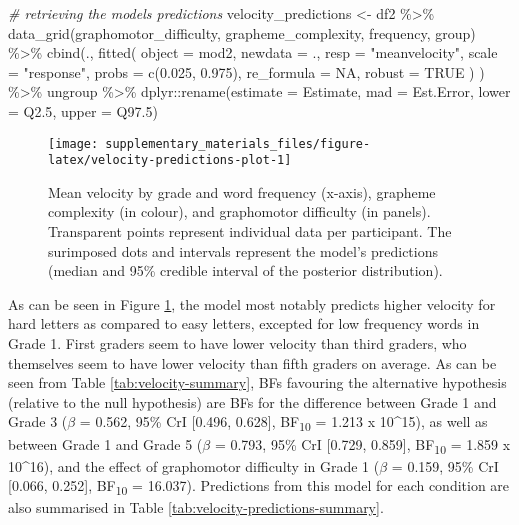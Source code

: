 \documentclass[
  11pt,
  english,
  ,doc,floatsintext]{apa6}
\newenvironment{Shaded}{}{}
\newcommand{\AttributeTok}[1]{\textcolor[rgb]{0.49,0.56,0.16}{#1}}
\newcommand{\CommentTok}[1]{\textcolor[rgb]{0.38,0.63,0.69}{\textit{#1}}}
\newcommand{\ConstantTok}[1]{\textcolor[rgb]{0.53,0.00,0.00}{#1}}
\newcommand{\FloatTok}[1]{\textcolor[rgb]{0.25,0.63,0.44}{#1}}
\newcommand{\FunctionTok}[1]{\textcolor[rgb]{0.02,0.16,0.49}{#1}}
\newcommand{\NormalTok}[1]{#1}
\newcommand{\OtherTok}[1]{\textcolor[rgb]{0.00,0.44,0.13}{#1}}
\newcommand{\SpecialCharTok}[1]{\textcolor[rgb]{0.25,0.44,0.63}{#1}}
\newcommand{\StringTok}[1]{\textcolor[rgb]{0.25,0.44,0.63}{#1}}
\begin{document}
\begin{Shaded}
\begin{Highlighting}[]
\CommentTok{\# retrieving the model\textquotesingle{}s predictions}
\NormalTok{velocity\_predictions }\OtherTok{\textless{}{-}}\NormalTok{ df2 }\SpecialCharTok{\%\textgreater{}\%}
    \FunctionTok{data\_grid}\NormalTok{(graphomotor\_difficulty, grapheme\_complexity, frequency, group) }\SpecialCharTok{\%\textgreater{}\%}
    \FunctionTok{cbind}\NormalTok{(., }\FunctionTok{fitted}\NormalTok{(}
        \AttributeTok{object =}\NormalTok{ mod2, }\AttributeTok{newdata =}\NormalTok{ ., }\AttributeTok{resp =} \StringTok{"meanvelocity"}\NormalTok{,}
        \AttributeTok{scale =} \StringTok{"response"}\NormalTok{, }\AttributeTok{probs =} \FunctionTok{c}\NormalTok{(}\FloatTok{0.025}\NormalTok{, }\FloatTok{0.975}\NormalTok{),}
        \AttributeTok{re\_formula =} \ConstantTok{NA}\NormalTok{, }\AttributeTok{robust =} \ConstantTok{TRUE}
\NormalTok{        ) ) }\SpecialCharTok{\%\textgreater{}\%}
\NormalTok{    ungroup }\SpecialCharTok{\%\textgreater{}\%}
\NormalTok{    dplyr}\SpecialCharTok{::}\FunctionTok{rename}\NormalTok{(}\AttributeTok{estimate =}\NormalTok{ Estimate, }\AttributeTok{mad =}\NormalTok{ Est.Error, }\AttributeTok{lower =}\NormalTok{ Q2}\FloatTok{.5}\NormalTok{, }\AttributeTok{upper =}\NormalTok{ Q97}\FloatTok{.5}\NormalTok{)}
\end{Highlighting}
\end{Shaded}

\begin{figure}[!htb]

{\centering \texttt{[image: supplementary\_materials\_files/figure-latex/velocity-predictions-plot-1]} 

}

\caption{Mean velocity by grade and word frequency (x-axis), grapheme complexity (in colour), and graphomotor difficulty (in panels). Transparent points represent individual data per participant. The surimposed dots and intervals represent the model's predictions (median and 95\% credible interval of the posterior distribution).}\label{fig:velocity-predictions-plot}
\end{figure}

As can be seen in Figure \ref{fig:velocity-predictions-plot}, the model most notably predicts higher velocity for hard letters as compared to easy letters, excepted for low frequency words in Grade 1. First graders seem to have lower velocity than third graders, who themselves seem to have lower velocity than fifth graders on average. As can be seen from Table \ref{tab:velocity-summary}, BFs favouring the alternative hypothesis (relative to the null hypothesis) are BFs for the difference between Grade 1 and Grade 3 (\(\beta\) = 0.562, 95\% CrI {[}0.496, 0.628{]}, BF\textsubscript{10} = 1.213 x 10\^{}15), as well as between Grade 1 and Grade 5 (\(\beta\) = 0.793, 95\% CrI {[}0.729, 0.859{]}, BF\textsubscript{10} = 1.859 x 10\^{}16), and the effect of graphomotor difficulty in Grade 1 (\(\beta\) = 0.159, 95\% CrI {[}0.066, 0.252{]}, BF\textsubscript{10} = 16.037). Predictions from this model for each condition are also summarised in Table \ref{tab:velocity-predictions-summary}.
\end{document}

